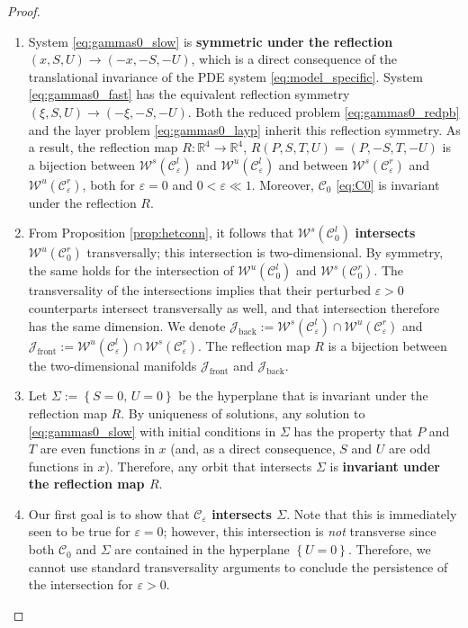 \documentclass[a4paper,10pt,abstract=true,parskip=true]{scrartcl}
\theoremstyle{remark}
\numberwithin{equation}{section}
\numberwithin{thm}{section}
\newcommand{\eps}{\varepsilon}
\begin{document}
\begin{proof}
\begin{enumerate}
    \item System \eqref{eq:gammas0_slow} is \textbf{symmetric under the reflection} $(x,S,U) \to (-x,-S,-U)$, which is a direct consequence of the translational invariance of the PDE system \eqref{eq:model_specific}. System \eqref{eq:gammas0_fast} has the equivalent reflection symmetry $(\xi,S,U) \to (-\xi,-S,-U)$. Both the reduced problem \eqref{eq:gammas0_redpb} and the layer problem \eqref{eq:gammas0_layp} inherit this reflection symmetry. As a result, the reflection map $R: \mathbb{R}^4 \to \mathbb{R}^4$, $R(P,S,T,U) = (P,-S,T,-U)$ is a bijection between $\mathcal{W}^s(\mathcal{C}_\eps^l)$ and $\mathcal{W}^u(\mathcal{C}_\eps^l)$ and between $\mathcal{W}^s(\mathcal{C}_\eps^r)$ and $\mathcal{W}^u(\mathcal{C}_\eps^r)$, both for $\eps=0$ and $0<\eps \ll 1$. Moreover, $\mathcal{C}_0$ \eqref{eq:C0} is invariant under the reflection $R$.
    \item From Proposition \ref{prop:hetconn}, it follows that $\mathcal{W}^s(\mathcal{C}_0^l)$ \textbf{intersects} $\mathcal{W}^u(\mathcal{C}_0^r)$ transversally; this intersection is two-dimensional. By symmetry, the same holds for the intersection of $\mathcal{W}^u(\mathcal{C}_0^l)$ and $\mathcal{W}^s(\mathcal{C}_0^r)$. The transversality of the intersections implies that their perturbed $\eps>0$ counterparts intersect transversally as well, and that intersection therefore has the same dimension. We denote $\mathcal{J}_\text{back} := \mathcal{W}^s(\mathcal{C}_\eps^l) \cap \mathcal{W}^u(\mathcal{C}_\eps^r)$ and $\mathcal{J}_\text{front} := \mathcal{W}^u(\mathcal{C}_\eps^l) \cap \mathcal{W}^s(\mathcal{C}_\eps^r)$. The reflection map $R$ is a bijection between the two-dimensional manifolds $\mathcal{J}_\text{front}$ and $\mathcal{J}_\text{back}$.
    \item Let $\Sigma := \left\{S=0,\,U=0\right\}$ be the hyperplane that is invariant under the reflection map $R$. By uniqueness of solutions, any solution to \eqref{eq:gammas0_slow} with initial conditions in $\Sigma$ has the property that $P$ and $T$ are even functions in $x$ (and, as a direct consequence, $S$ and $U$ are odd functions in $x$). Therefore, any orbit that intersects $\Sigma$ is \textbf{invariant under the reflection map $R$}. 
    \item Our first goal is to show that \textbf{$\mathcal{C}_\eps$ intersects $\Sigma$}. Note that this is immediately seen to be true for $\eps=0$; however, this intersection is \emph{not} transverse since both $\mathcal{C}_0$ and $\Sigma$ are contained in the hyperplane $\left\{U=0\right\}$. Therefore, we cannot use standard transversality arguments to conclude the persistence of the intersection for $\eps>0$.\\

\end{enumerate}
\end{proof}
\end{document}
